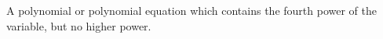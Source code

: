 A polynomial or polynomial equation which contains the fourth power 
of the variable, but no higher power.